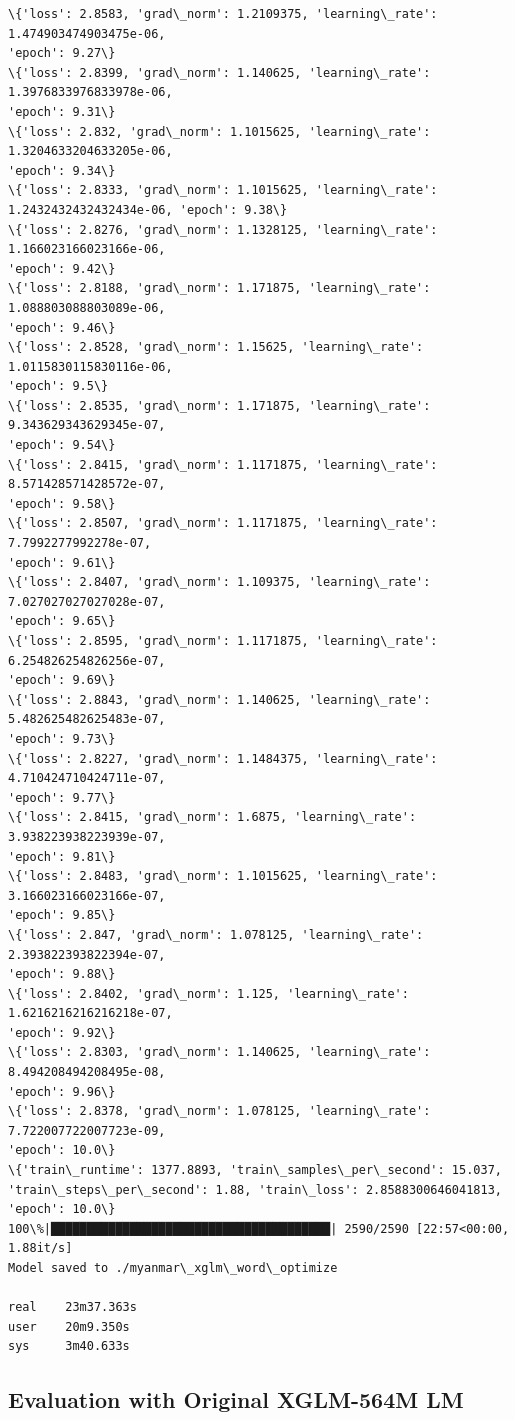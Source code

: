 \documentclass[11pt]{article}
\begin{document}
\begin{Verbatim}[commandchars=\\\{\}]
\{'loss': 2.8583, 'grad\_norm': 1.2109375, 'learning\_rate': 1.474903474903475e-06,
'epoch': 9.27\}
\{'loss': 2.8399, 'grad\_norm': 1.140625, 'learning\_rate': 1.3976833976833978e-06,
'epoch': 9.31\}
\{'loss': 2.832, 'grad\_norm': 1.1015625, 'learning\_rate': 1.3204633204633205e-06,
'epoch': 9.34\}
\{'loss': 2.8333, 'grad\_norm': 1.1015625, 'learning\_rate':
1.2432432432432434e-06, 'epoch': 9.38\}
\{'loss': 2.8276, 'grad\_norm': 1.1328125, 'learning\_rate': 1.166023166023166e-06,
'epoch': 9.42\}
\{'loss': 2.8188, 'grad\_norm': 1.171875, 'learning\_rate': 1.088803088803089e-06,
'epoch': 9.46\}
\{'loss': 2.8528, 'grad\_norm': 1.15625, 'learning\_rate': 1.0115830115830116e-06,
'epoch': 9.5\}
\{'loss': 2.8535, 'grad\_norm': 1.171875, 'learning\_rate': 9.343629343629345e-07,
'epoch': 9.54\}
\{'loss': 2.8415, 'grad\_norm': 1.1171875, 'learning\_rate': 8.571428571428572e-07,
'epoch': 9.58\}
\{'loss': 2.8507, 'grad\_norm': 1.1171875, 'learning\_rate': 7.7992277992278e-07,
'epoch': 9.61\}
\{'loss': 2.8407, 'grad\_norm': 1.109375, 'learning\_rate': 7.027027027027028e-07,
'epoch': 9.65\}
\{'loss': 2.8595, 'grad\_norm': 1.1171875, 'learning\_rate': 6.254826254826256e-07,
'epoch': 9.69\}
\{'loss': 2.8843, 'grad\_norm': 1.140625, 'learning\_rate': 5.482625482625483e-07,
'epoch': 9.73\}
\{'loss': 2.8227, 'grad\_norm': 1.1484375, 'learning\_rate': 4.710424710424711e-07,
'epoch': 9.77\}
\{'loss': 2.8415, 'grad\_norm': 1.6875, 'learning\_rate': 3.938223938223939e-07,
'epoch': 9.81\}
\{'loss': 2.8483, 'grad\_norm': 1.1015625, 'learning\_rate': 3.166023166023166e-07,
'epoch': 9.85\}
\{'loss': 2.847, 'grad\_norm': 1.078125, 'learning\_rate': 2.393822393822394e-07,
'epoch': 9.88\}
\{'loss': 2.8402, 'grad\_norm': 1.125, 'learning\_rate': 1.6216216216216218e-07,
'epoch': 9.92\}
\{'loss': 2.8303, 'grad\_norm': 1.140625, 'learning\_rate': 8.494208494208495e-08,
'epoch': 9.96\}
\{'loss': 2.8378, 'grad\_norm': 1.078125, 'learning\_rate': 7.722007722007723e-09,
'epoch': 10.0\}
\{'train\_runtime': 1377.8893, 'train\_samples\_per\_second': 15.037,
'train\_steps\_per\_second': 1.88, 'train\_loss': 2.8588300646041813, 'epoch': 10.0\}
100\%|███████████████████████████████████████| 2590/2590 [22:57<00:00,  1.88it/s]
Model saved to ./myanmar\_xglm\_word\_optimize

real    23m37.363s
user    20m9.350s
sys     3m40.633s
    \end{Verbatim}

    \hypertarget{evaluation-with-original-xglm-564m-lm}{%
\subsection{Evaluation with Original XGLM-564M
LM}\label{evaluation-with-original-xglm-564m-lm}}
\end{document}
